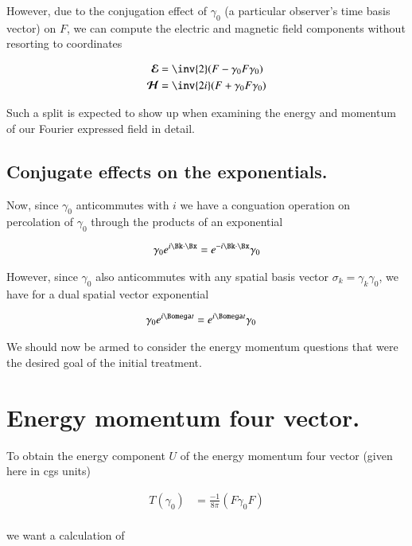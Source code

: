 \documentclass{article}
\newcommand{\EE}[0]{\boldsymbol{\mathcal{E}}}
\newcommand{\HH}[0]{\boldsymbol{\mathcal{H}}}
\begin{document}
However, due to the conjugation effect of $\gamma_0$ 
(a particular observer's time basis vector)
on $F$, 
we can compute the electric and magnetic field components without resorting to coordinates

\begin{align}
\EE &= \inv{2}(F - \gamma_0 F \gamma_0 ) \\
\HH &= \inv{2i}(F + \gamma_0 F \gamma_0 )
\end{align}

Such a split is expected to show up when examining the energy and momentum of our Fourier expressed field in detail.

\subsection{ Conjugate effects on the exponentials. }

Now, since $\gamma_0$ anticommutes with $i$ we have a conguation operation on percolation of $\gamma_0$ through the products of an exponential

\begin{align}
\gamma_0 e^{i \Bk \cdot \Bx} = e^{-i \Bk \cdot \Bx} \gamma_0 
\end{align}

However, since $\gamma_0$ also anticommutes with any spatial basis vector $\sigma_k = \gamma_k \gamma_0$, we have for a dual spatial vector exponential

\begin{align}
\gamma_0 e^{i \Bomega t} &= e^{i \Bomega t} \gamma_0
\end{align}

We should now be armed to consider the energy momentum questions that were the desired goal of the initial treatment.

\section{ Energy momentum four vector. }

To obtain the energy component $U$ of the energy momentum four
vector (given here in cgs units)

\begin{align*}
T(\gamma_0) &= \frac{-1}{8\pi}(F \gamma_0 F) \\
\end{align*}

we want a calculation of
\end{document}
